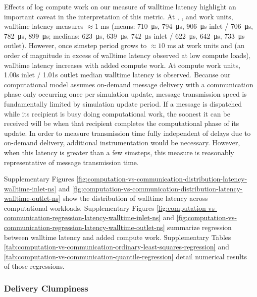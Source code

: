 Effects of log compute work on our measure of walltime latency highlight an important caveat in the interpretation of this metric.
At , , and  work units, walltime latency measures $\approx 1$ ms (means: \SI{710}{\micro\second}, \SI{794}{\micro\second}, \SI{906}{\micro\second} inlet / \SI{706}{\micro\second}, \SI{782}{\micro\second}, \SI{899}{\micro\second}; medians: \SI{623}{\micro\second}, \SI{639}{\micro\second}, \SI{742}{\micro\second} inlet / \SI{622}{\micro\second}, \SI{642}{\micro\second}, \SI{733}{\micro\second} outlet).
However, once simstep period grows to $\approx 10$ ms at  work units and (an order of magnitude in excess of walltime latency observed at low compute loads), walltime latency increases with added compute work.
At  compute work units, 1.00s inlet / 1.01s outlet median walltime latency is observed.
Because our computational model assumes on-demand message delivery with a communication phase only occurring once per simulation update, message transmission speed is fundamentally limited by simulation update period.
If a message is dispatched while its recipient is busy doing computational work, the soonest it can be received will be when that recipient completes the computational phase of its update.
In order to measure transmission time fully independent of delays due to on-demand delivery, additional instrumentation would be necessary.
However, when this latency is greater than a few simsteps, this measure is reasonably representative of message transmission time.

Supplementary Figures \ref{fig:computation-vs-communication-distribution-latency-walltime-inlet-ns} and \ref{fig:computation-vs-communication-distribution-latency-walltime-outlet-ns} show the distribution of walltime latency across computational workloads.
Supplementary Figures \ref{fig:computation-vs-communication-regression-latency-walltime-inlet-ns} and \ref{fig:computation-vs-communication-regression-latency-walltime-outlet-ns} summarize regression between walltime latency and added compute work.
Supplementary Tables \ref{tab:computation-vs-communication-ordinary-least-squares-regression} and \ref{tab:computation-vs-communication-quantile-regression} detail numerical results of those regressions.

\subsubsection{Delivery Clumpiness}


